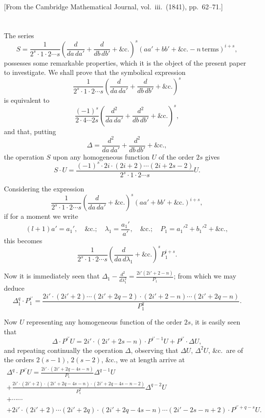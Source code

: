 \documentclass[11pt,a4paper]{book}
\begin{document}
\begin{center}
\small[From the Cambridge Mathematical Journal, vol.~iii.\ (1841), pp.~62--71.]
\end{center}

\section*{}

The series
\[
S = \frac{1}{2^s \cdot 1 \cdot 2 \cdots s} \left(\frac{d}{da\, da'} + \frac{d}{db\, db'} + \&\mathrm{c.}\right)^s
(aa' + bb' + \&\mathrm{c.} - n\,\mathrm{terms})^{i+s},
\]
possesses some remarkable properties, which it is the object of the present paper to investigate. We shall prove that the symbolical expression
\[
\frac{1}{2^s \cdot 1 \cdot 2 \cdots s} \left(\frac{d}{da\, da'} + \frac{d}{db\, db'} + \&\mathrm{c.}\right)^s
\]
is equivalent to
\[
\frac{(-1)^s}{2 \cdot 4 \cdots 2s} \left(\frac{d^2}{da\, da'} + \frac{d^2}{db\, db'} + \&\mathrm{c.}\right)^s,
\]
and that, putting
\[
\Delta = \frac{d^2}{da\, da'} + \frac{d^2}{db\, db'} + \&\mathrm{c.},
\]
the operation $S$ upon any homogeneous function $U$ of the order $2s$ gives
\[
S \cdot U = \frac{(-1)^s \cdot 2i \cdot (2i+2) \cdots (2i+2s-2)}{2^s \cdot 1 \cdot 2 \cdots s} U.
\]

Considering the expression
\[
\frac{1}{2^s \cdot 1 \cdot 2 \cdots s} \left(\frac{d}{da\, da'} + \&\mathrm{c.}\right)^s (aa' + bb' + \&\mathrm{c.})^{i+s},
\]
if for a moment we write
\[
(l+1)a' = a_1', \quad \&\mathrm{c.}; \quad \lambda_1 = \frac{a_1'}{a'}, \quad \&\mathrm{c.};
\quad P_1 = a_1'^2 + b_1'^2 + \&\mathrm{c.},
\]
this becomes
\[
\frac{1}{2^s \cdot 1 \cdot 2 \cdots s} \left(\frac{d}{da\, d\lambda_1} + \&\mathrm{c.}\right)^s P_1^{i+s}.
\]

Now it is immediately seen that $\Delta_1 - \frac{d^2}{d\lambda_1^2} = \frac{2i'(2i'+2-n)}{P_1}$; from which we may deduce
\[
\Delta_1^q \cdot P_1^{i'} = \frac{2i' \cdot (2i'+2) \cdots (2i'+2q-2) \cdot (2i'+2-n) \cdots (2i'+2q-n)}{P_1^q}.
\]

Now $U$ representing any homogeneous function of the order $2s$, it is easily seen that
\[
\Delta \cdot P^{i'} U = 2i' \cdot (2i'+2s-n) \cdot P^{i'-1} U + P^{i'} \cdot \Delta U,
\]
and repeating continually the operation $\Delta$, observing that $\Delta U$, $\Delta^2 U$, \&c.\ are of the orders $2(s-1)$, $2(s-2)$, \&c., we at length arrive at
\begin{multline*}
\Delta^q \cdot P^{i'} U = \frac{2i' \cdot (2i'+2q-4s-n)}{P_1} \Delta^{q-1} U \\
+ \frac{2i' \cdot (2i'+2) \cdot (2i'+2q-4s-n) \cdot (2i'+2q-4s-n-2)}{P_1^2} \Delta^{q-2} U \\
+ \cdots \cdots \\
+ 2i' \cdot (2i'+2) \cdots (2i'+2q) \cdot (2i'+2q-4s-n) \cdots (2i'-2s-n+2) \cdot P^{i'+q-s} U.
\end{multline*}
\end{document}
